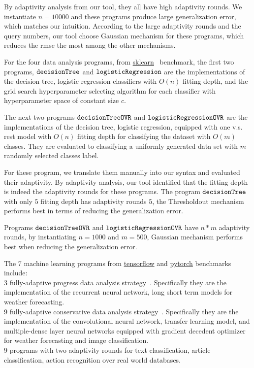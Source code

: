 By adaptivity analysis from our tool, they all have high adaptivity rounds.
We instantiate $n = 10000$ and these programs produce large generalization error, which matches our intuition.
According to the large adaptivity rounds and the query numbers, our tool choose Gaussian mechanism for these programs, which reduces the rmse the most
among the other mechanisms.


For the four data analysis programs, 
from \hyperlink{https://github.com/scikit-learn/scikit-learn/tree/main/examples}{sklearn}~\cite{SklearnBenchmark} benchmark,
the first two programs, $\mathtt{decisionTree}$ and $\mathtt{logisticRegression}$ are
the
implementations of the decision tree, logistic regression classifiers
with $O(n)$ fitting depth,
and the grid search hyperparameter selecting algorithm for each classifier with 
hyperparameter space of constant size $c$.

The next two programs $\mathtt{decisionTreeOVR}$ and $\mathtt{logisticRegressionOVR}$ are
the implementations of the  decision tree, logistic regression, equipped with one v.s. rest model with $O(n)$ fitting depth for classifying the dataset with $O(m)$ classes.
They are evaluated to classifying a uniformly generated data set with $m$ randomly selected classes label.

For these program, we translate them manually into our syntax and evaluated their adaptivity.
By adaptivity analysis, our tool identified that the fitting depth is indeed the adaptivity rounds for these programs.
The program $\mathtt{decisionTree}$ with only $5$ fitting depth has adaptivity rounds $5$,
the Thresholdout mechanism performs best in terms of reducing the generalization error.

Programs $\mathtt{decisionTreeOVR}$ and $\mathtt{logisticRegressionOVR}$ 
have $n*m$ adaptivity rounds, by instantiating $n = 1000$ and $m = 500$,
Gaussian mechanism performs best when reducing the generalization error.








The 7 machine learning programs
from \hyperlink{https://github.com/tensorflow/tensorflow/tree/master/tensorflow/examples}{tensorflow}
and \hyperlink{https://github.com/pytorch/pytorch}{pytorch}
benchmarks include:
\\
3 fully-adaptive progress data analysis
strategy~\cite{ZrnicH19}.
Specifically they are the implementation of the recurrent neural network, long short term models for 
weather forecasting.
\\
9
fully-adaptive conservative data analysis
strategy~\cite{ZrnicH19}.
Specifically they are the implementation of the convolutional neural network, transfer learning model,
and multiple-dense layer neural networks equipped with gradient decedent optimizer for
weather forecasting and image classification.
\\
9 programs with two adaptivity rounds for text classification,
article classification, action recognition over real world databases.
